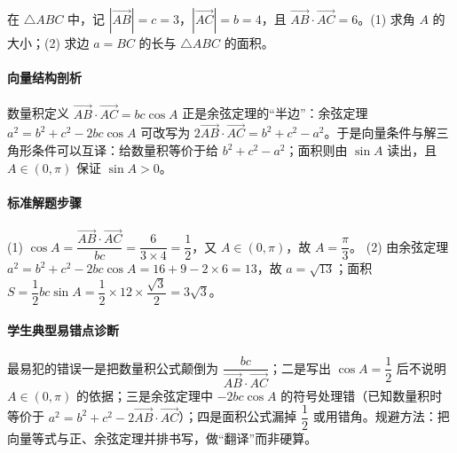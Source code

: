 \begin{problem}
在 $\triangle ABC$ 中，记 $|\overrightarrow{AB}|=c=3$，$|\overrightarrow{AC}|=b=4$，且 $\overrightarrow{AB}\cdot\overrightarrow{AC}=6$。(1) 求角 $A$ 的大小；(2) 求边 $a=BC$ 的长与 $\triangle ABC$ 的面积。
\end{problem}
\begin{solution}
\paragraph{向量结构剖析}
数量积定义 $\overrightarrow{AB}\cdot\overrightarrow{AC}=bc\cos A$ 正是余弦定理的“半边”：余弦定理 $a^2=b^2+c^2-2bc\cos A$ 可改写为 $2\overrightarrow{AB}\cdot\overrightarrow{AC}=b^2+c^2-a^2$。于是向量条件与解三角形条件可以互译：给数量积等价于给 $b^2+c^2-a^2$；面积则由 $\sin A$ 读出，且 $A\in(0,\pi)$ 保证 $\sin A>0$。
\paragraph{标准解题步骤}
(1) $\cos A=\dfrac{\overrightarrow{AB}\cdot\overrightarrow{AC}}{bc}=\dfrac{6}{3\times4}=\dfrac12$，又 $A\in(0,\pi)$，故 $A=\dfrac{\pi}{3}$。
(2) 由余弦定理 $a^2=b^2+c^2-2bc\cos A=16+9-2\times6=13$，故 $a=\sqrt{13}$；面积 $S=\dfrac12bc\sin A=\dfrac12\times12\times\dfrac{\sqrt3}{2}=3\sqrt3$。
\paragraph{学生典型易错点诊断}
最易犯的错误一是把数量积公式颠倒为 $\dfrac{bc}{\overrightarrow{AB}\cdot\overrightarrow{AC}}$；二是写出 $\cos A=\dfrac12$ 后不说明 $A\in(0,\pi)$ 的依据；三是余弦定理中 $-2bc\cos A$ 的符号处理错（已知数量积时等价于 $a^2=b^2+c^2-2\overrightarrow{AB}\cdot\overrightarrow{AC}$）；四是面积公式漏掉 $\dfrac12$ 或用错角。规避方法：把向量等式与正、余弦定理并排书写，做“翻译”而非硬算。
\end{solution}

